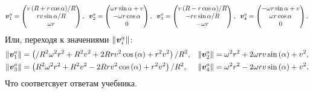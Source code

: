 \begin{align*}
\vc{v}_1^a = 
\left(\begin{matrix}{v \left(R + r \cos{\alpha}\right)}/{R} \\ {r v \sin{\alpha}}/{R}\\\omega r\end{matrix}\right),
% 
\hspace{0.2cm} 
% 
\vc{v}_2^a = 
\left(\begin{matrix}\omega r \sin{\alpha} + v\\- \omega r \cos{\alpha }\\0\end{matrix}\right),
% 
\hspace{0.2cm} 
\vc{v}_3^a = 
\left(\begin{matrix}{v \left(R - r \cos{\alpha}\right)}/{R}\\- {r v \sin{\alpha}}/{R}\\- \omega r\end{matrix}\right),
% 
\hspace{0.2cm} 
\vc{v}_4^a = 
\left(\begin{matrix}- \omega r \sin{\alpha} + v\\\omega r \cos{\alpha}\\0\end{matrix}\right).
\end{align*}
Или, переходя к значениями $\|\mbox{\boldmath $v$}_i^a\|$:
\begin{align*}
& \|\vc{v}_1^a\| = \left(/{R^{2} \omega^{2} r^{2} + R^{2} v^{2} + 2 R r v^{2} \cos{\left(\alpha \right)} + r^{2} v^{2}}\right)/{R^{2}}, 
% 
& \|\vc{v}_2^a\| = \omega^{2} r^{2} + 2 \omega r v \sin{\left(\alpha \right)} + v^{2}, \\
% 
& \|\vc{v}_3^a\| = \left({R^{2} \omega^{2} r^{2} + R^{2} v^{2} - 2 R r v^{2} \cos{\left(\alpha \right)} + r^{2} v^{2}}\right)/{R^{2}}, 
% 
& \|\vc{v}_4^a\| = \omega^{2} r^{2} - 2 \omega r v \sin{\left(\alpha \right)} + v^{2}.
\end{align*}
Что соответсвует ответам учебника.

